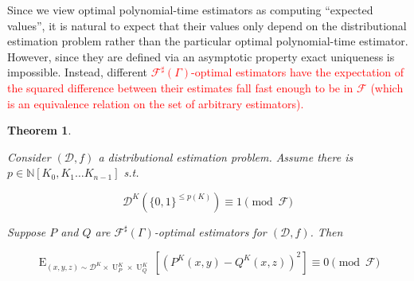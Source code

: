 \documentclass[11pt]{article}
\numberwithin{equation}{section}
\theoremstyle{definition}
\theoremstyle{plain}
\newtheorem{theorem}{Theorem}[section]
\newcommand{\Bool}{\{0,1\}}
\DeclareMathOperator{\E}{E}
\DeclareMathOperator{\Un}{U}
\newcommand{\Nats}{\mathbb{N}}
\newcommand{\NatPoly}{\Nats[K_0, K_1 \ldots K_{n-1}]}
\newcommand{\Dist}{\mathcal{D}}
\newcommand{\Fall}{\mathcal{F}}
\newcommand{\ESG}{\Fall^\sharp(\Gamma)}
\begin{document}
Since we view optimal polynomial-time estimators as computing \enquote{expected values}, it is natural to expect that their values only depend on the distributional estimation problem rather than the particular optimal polynomial-time estimator. However, since they are defined via an asymptotic property exact uniqueness is impossible. Instead, different \textcolor{red}{$\Fall^\sharp(\Gamma)$-optimal estimators have the expectation of the squared difference between their estimates fall fast enough to be in $\Fall$ (which is an equivalence relation on the set of arbitrary estimators).}

\begin{samepage}
\begin{theorem}
\label{thm:uniq}

Consider ${(\Dist,f)}$ a distributional estimation problem. Assume there is\\ ${p \in \NatPoly}$ s.t. 

\begin{equation}
\label{eqn:thm__uniq__dist}
\Dist^K(\Bool^{\leq p(K)}) \equiv 1 \pmod \Fall
\end{equation}

Suppose ${P}$ and ${Q}$ are ${\ESG}$-optimal estimators for ${(\Dist,f)}$. Then

\begin{equation}
\label{eqn:thm__uniq}
\E_{(x,y,z) \sim \Dist^K \times \Un_P^K \times \Un_Q^K}[(P^K(x,y)-Q^K(x,z))^2] \equiv 0 \pmod \Fall
\end{equation}

\end{theorem}
\end{samepage}
\end{document}
